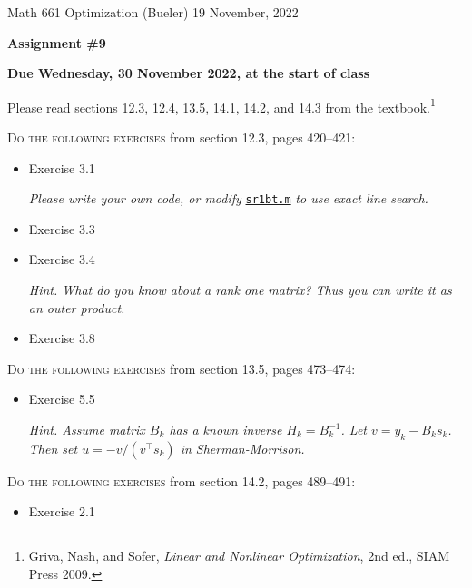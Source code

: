 \documentclass[12pt]{amsart}
\begin{document}
\scriptsize \noindent Math 661 Optimization (Bueler) \hfill 19 November, 2022
\normalsize

\medskip\bigskip

\Large\centerline{\textbf{Assignment \#9}}
\large
\bigskip

\centerline{\textbf{Due Wednesday, 30 November 2022, at the start of class}}
\bigskip
\normalsize

\thispagestyle{empty}

\bigskip
Please read sections 12.3, 12.4, 13.5, 14.1, 14.2, and 14.3 from the textbook.\footnote{Griva, Nash, and Sofer, \emph{Linear and Nonlinear Optimization}, 2nd ed., SIAM Press 2009.}

\bigskip
\noindent \textsc{Do the following exercises} from section 12.3, pages 420--421:

\begin{itemize}
\item Exercise 3.1 \quad \begin{minipage}[t]{4.5in} \emph{Please write your own code, or modify} \href{https://bueler.github.io/opt/assets/codes/sr1bt.m}{\texttt{sr1bt.m}} \emph{to use exact line search.} \end{minipage}
\item Exercise 3.3
\item Exercise 3.4 \quad \begin{minipage}[t]{4.5in} \emph{Hint.  What do you know about a rank one matrix?  Thus you can write it as an outer product.} \end{minipage}
\item Exercise 3.8
\end{itemize}


\bigskip
\noindent \textsc{Do the following exercises} from section 13.5, pages 473--474:

\begin{itemize}
\item Exercise 5.5 \quad \begin{minipage}[t]{4.5in} \emph{Hint.  Assume matrix $B_k$ has a known inverse $H_k=B_k^{-1}$.  Let $v=y_k - B_k s_k$.  Then set $u=-v/(v^\top s_k)$ in Sherman-Morrison.} \end{minipage}
\end{itemize}


\bigskip
\noindent \textsc{Do the following exercises} from section 14.2, pages 489--491:

\begin{itemize}
\item Exercise 2.1
\end{itemize}
\end{document}
